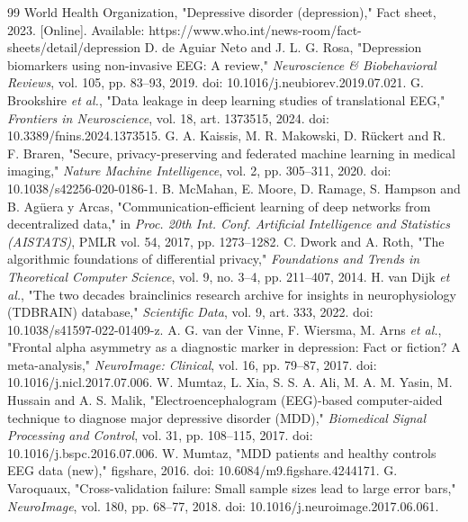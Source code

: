 \documentclass[12pt,a4paper,oneside]{report}
\begin{document}
\clearpage{}
\begin{thebibliography}{99}\small{}
 World Health Organization, "Depressive disorder (depression)," Fact sheet, 2023. [Online]. Available: https://www.who.int/news-room/fact-sheets/detail/depression
 D. de Aguiar Neto and J. L. G. Rosa, "Depression biomarkers using non-invasive EEG: A review," \emph{Neuroscience \& Biobehavioral Reviews}, vol. 105, pp. 83--93, 2019. doi: 10.1016/j.neubiorev.2019.07.021.
 G. Brookshire \emph{et al.}, "Data leakage in deep learning studies of translational EEG," \emph{Frontiers in Neuroscience}, vol. 18, art. 1373515, 2024. doi: 10.3389/fnins.2024.1373515.
 G. A. Kaissis, M. R. Makowski, D. Rückert and R. F. Braren, "Secure, privacy-preserving and federated machine learning in medical imaging," \emph{Nature Machine Intelligence}, vol. 2, pp. 305--311, 2020. doi: 10.1038/s42256-020-0186-1.
 B. McMahan, E. Moore, D. Ramage, S. Hampson and B. Agüera y Arcas, "Communication-efficient learning of deep networks from decentralized data," in \emph{Proc. 20th Int. Conf. Artificial Intelligence and Statistics (AISTATS)}, PMLR vol. 54, 2017, pp. 1273--1282.
 C. Dwork and A. Roth, "The algorithmic foundations of differential privacy," \emph{Foundations and Trends in Theoretical Computer Science}, vol. 9, no. 3--4, pp. 211--407, 2014.
 H. van Dijk \emph{et al.}, "The two decades brainclinics research archive for insights in neurophysiology (TDBRAIN) database," \emph{Scientific Data}, vol. 9, art. 333, 2022. doi: 10.1038/s41597-022-01409-z.
 A. G. van der Vinne, F. Wiersma, M. Arns \emph{et al.}, "Frontal alpha asymmetry as a diagnostic marker in depression: Fact or fiction? A meta-analysis," \emph{NeuroImage: Clinical}, vol. 16, pp. 79--87, 2017. doi: 10.1016/j.nicl.2017.07.006.
 W. Mumtaz, L. Xia, S. S. A. Ali, M. A. M. Yasin, M. Hussain and A. S. Malik, "Electroencephalogram (EEG)-based computer-aided technique to diagnose major depressive disorder (MDD)," \emph{Biomedical Signal Processing and Control}, vol. 31, pp. 108--115, 2017. doi: 10.1016/j.bspc.2016.07.006.
 W. Mumtaz, "MDD patients and healthy controls EEG data (new)," figshare, 2016. doi: 10.6084/m9.figshare.4244171.
 G. Varoquaux, "Cross-validation failure: Small sample sizes lead to large error bars," \emph{NeuroImage}, vol. 180, pp. 68--77, 2018. doi: 10.1016/j.neuroimage.2017.06.061.

\end{thebibliography}
\end{document}
